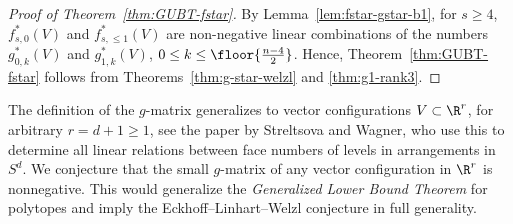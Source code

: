 \begin{proof}[Proof of Theorem~\ref{thm:GUBT-fstar}]
By Lemma~\ref{lem:fstar-gstar-b1}, for $s\geq 4$, $f_{s,0}^*(V)$ and $f_{s,\leq 1}^*(V)$ are non-negative linear combinations of the numbers $g^*_{0,k}(V)$ and $g^*_{1,k}(V)$, $0\leq k \leq \floor{\frac{n-4}{2}}$. Hence, Theorem~\ref{thm:GUBT-fstar} follows from Theorems~\ref{thm:g-star-welzl} and \ref{thm:g1-rank3}. 
\end{proof}
\begin{remark} The definition of the $g$-matrix generalizes to vector configurations $V\subset \R^r$, for arbitrary $r=d+1 \geq 1$, see the paper \cite{SW:DS} by Streltsova and Wagner, who use this to determine all linear relations between face numbers of levels in arrangements in $S^d$. We conjecture that the small $g$-matrix of any vector configuration in $\R^r$ is nonnegative. This would generalize the \emph{Generalized Lower Bound Theorem} for polytopes and imply the Eckhoff--Linhart--Welzl conjecture in full generality.
\end{remark}
%
